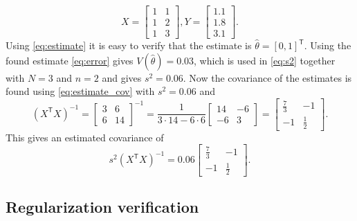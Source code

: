 \documentclass[]{article}
\begin{document}
\begin{equation}
	X = \begin{bmatrix}
	1 & 1 \\
	1 & 2 \\
	1 & 3
	\end{bmatrix},
	Y = \begin{bmatrix}
	1.1 \\
	1.8 \\
	3.1
	\end{bmatrix}.
\end{equation}
Using \eqref{eq:estimate} it is easy to verify that the estimate is $\hat{\theta} = [0, 1]^\mathsf{T}$. Using the found estimate \eqref{eq:error} gives $V(\hat{\theta})=0.03$, which is used in \eqref{eq:s2} together with $N=3$ and $n=2$ and gives $s^2=0.06$. Now the covariance of the estimates is found using \eqref{eq:estimate_cov} with $s^2=0.06$ and
\begin{equation}
	(X^\mathsf{T}X)^{-1} = \begin{bmatrix}
	3 & 6 \\
	6 & 14 
	\end{bmatrix}^{-1}=\frac{1}{3\cdot14-6\cdot6}\begin{bmatrix}
	14 & -6 \\
	-6 & 3 
	\end{bmatrix} = \begin{bmatrix}
	\frac{7}{3} & -1 \\
	-1 & \frac{1}{2} 
	\end{bmatrix}.
\end{equation}
This gives an estimated covariance of 
\begin{equation}
	s^2(X^\mathsf{T}X)^{-1} = 0.06\begin{bmatrix}
	\frac{7}{3} & -1 \\
	-1 & \frac{1}{2} 
	\end{bmatrix}.
\end{equation}

\subsection{Regularization verification}
\end{document}
